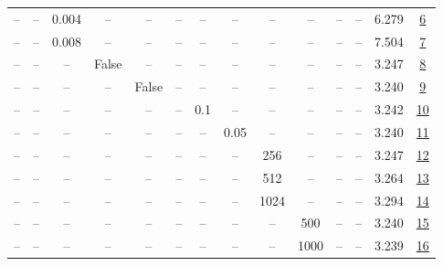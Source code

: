 \begin{table}[H]
\begin{tabular}{cccccccccccccc}
-- & -- & 0.004 & -- & -- & -- & -- & -- & -- & -- & -- & -- & 6.279 & \href{https://wandb.ai/stanford-mercury/optimizer-scaling/runs/sweep-130m-21B-krona75eb9lr0.004-wd0.5-b10.95-plr0.2-pis1-gn1-no-b73759}{6} \\
-- & -- & 0.008 & -- & -- & -- & -- & -- & -- & -- & -- & -- & 7.504 & \href{https://wandb.ai/stanford-mercury/optimizer-scaling/runs/sweep-130m-21B-kron5a8102lr0.008-wd0.5-b10.95-plr0.2-pis1-gn1-no-475004}{7} \\
-- & -- & -- & False & -- & -- & -- & -- & -- & -- & -- & -- & 3.247 & \href{https://wandb.ai/stanford-mercury/optimizer-scaling/runs/sweep-130m-21B-kron655886lr0.001-wd0.5-b10.95-plr0.2-pis1-gn1-no-9fcd23}{8} \\
-- & -- & -- & -- & False & -- & -- & -- & -- & -- & -- & -- & 3.240 & \href{https://wandb.ai/stanford-mercury/optimizer-scaling/runs/sweep-130m-21B-kron3be334lr0.001-wd0.5-b10.95-plr0.2-pis1-gn1-no-189c09}{9} \\
-- & -- & -- & -- & -- & -- & 0.1 & -- & -- & -- & -- & -- & 3.242 & \href{https://wandb.ai/stanford-mercury/optimizer-scaling/runs/sweep-130m-21B-kron2c06b9lr0.001-wd0.5-b10.95-plr0.1-pis1-gn1-no-156c36}{10} \\
-- & -- & -- & -- & -- & -- & -- & 0.05 & -- & -- & -- & -- & 3.240 & \href{https://wandb.ai/stanford-mercury/optimizer-scaling/runs/sweep-130m-21B-kronf63620lr0.001-wd0.5-b10.95-plr0.2-pis1-gn1-no-8d37da}{11} \\
-- & -- & -- & -- & -- & -- & -- & -- & 256 & -- & -- & -- & 3.247 & \href{https://wandb.ai/stanford-mercury/optimizer-scaling/runs/sweep-130m-21B-kronb99966lr0.001-wd0.5-b10.95-plr0.2-pis1-gn1-no-87a643}{12} \\
-- & -- & -- & -- & -- & -- & -- & -- & 512 & -- & -- & -- & 3.264 & \href{https://wandb.ai/stanford-mercury/optimizer-scaling/runs/sweep-130m-21B-kronz798587lr0.001-wd0.5-b10.95-plr0.2-pis1-gn1-n-b546f9}{13} \\
-- & -- & -- & -- & -- & -- & -- & -- & 1024 & -- & -- & -- & 3.294 & \href{https://wandb.ai/stanford-mercury/optimizer-scaling/runs/sweep-130m-21B-kron8f965elr0.001-wd0.5-b10.95-plr0.2-pis1-gn1-no-5a3434}{14} \\
-- & -- & -- & -- & -- & -- & -- & -- & -- & 500 & -- & -- & 3.240 & \href{https://wandb.ai/stanford-mercury/optimizer-scaling/runs/sweep-130m-21B-krona3d4b1lr0.001-wd0.5-b10.95-plr0.2-pis1-gn1-no-734cae}{15} \\
-- & -- & -- & -- & -- & -- & -- & -- & -- & 1000 & -- & -- & 3.239 & \href{https://wandb.ai/stanford-mercury/optimizer-scaling/runs/sweep-130m-21B-kronaca326lr0.001-wd0.5-b10.95-plr0.2-pis1-gn1-no-ac5a71}{16} \\

\end{tabular}
\end{table}
